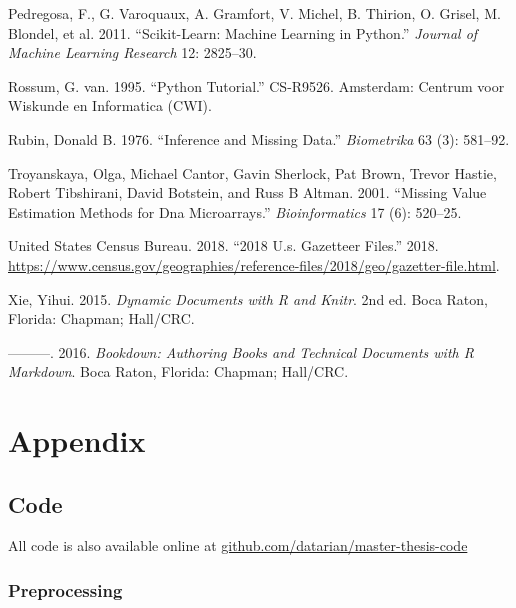 \documentclass[
  11pt,
  a4paper,
  DIV=12,captions=tableheading,oneside]{scrbook}
\begin{document}
\leavevmode\hypertarget{ref-scikit-learn}{}%
Pedregosa, F., G. Varoquaux, A. Gramfort, V. Michel, B. Thirion, O. Grisel, M. Blondel, et al. 2011. ``Scikit-Learn: Machine Learning in Python.'' \emph{Journal of Machine Learning Research} 12: 2825--30.

\leavevmode\hypertarget{ref-CS-R9526}{}%
Rossum, G. van. 1995. ``Python Tutorial.'' CS-R9526. Amsterdam: Centrum voor Wiskunde en Informatica (CWI).

\leavevmode\hypertarget{ref-rubin1976inference}{}%
Rubin, Donald B. 1976. ``Inference and Missing Data.'' \emph{Biometrika} 63 (3): 581--92.

\leavevmode\hypertarget{ref-troyanskaya2001missing}{}%
Troyanskaya, Olga, Michael Cantor, Gavin Sherlock, Pat Brown, Trevor Hastie, Robert Tibshirani, David Botstein, and Russ B Altman. 2001. ``Missing Value Estimation Methods for Dna Microarrays.'' \emph{Bioinformatics} 17 (6): 520--25.

\leavevmode\hypertarget{ref-census-gazet}{}%
United States Census Bureau. 2018. ``2018 U.s. Gazetteer Files.'' 2018. \url{https://www.census.gov/geographies/reference-files/2018/geo/gazetter-file.html}.

\leavevmode\hypertarget{ref-xie2015}{}%
Xie, Yihui. 2015. \emph{Dynamic Documents with R and Knitr}. 2nd ed. Boca Raton, Florida: Chapman; Hall/CRC.

\leavevmode\hypertarget{ref-xie2016bookdown}{}%
---------. 2016. \emph{Bookdown: Authoring Books and Technical Documents with R Markdown}. Boca Raton, Florida: Chapman; Hall/CRC.

\hypertarget{appendix}{%
\chapter*{Appendix}\label{appendix}}

\hypertarget{code}{%
\section{Code}\label{code}}

All code is also available online at \href{https://github.com/datarian/master-thesis-code}{github.com/datarian/master-thesis-code}

\hypertarget{preprocessing-1}{%
\subsection{Preprocessing}\label{preprocessing-1}}
\end{document}
